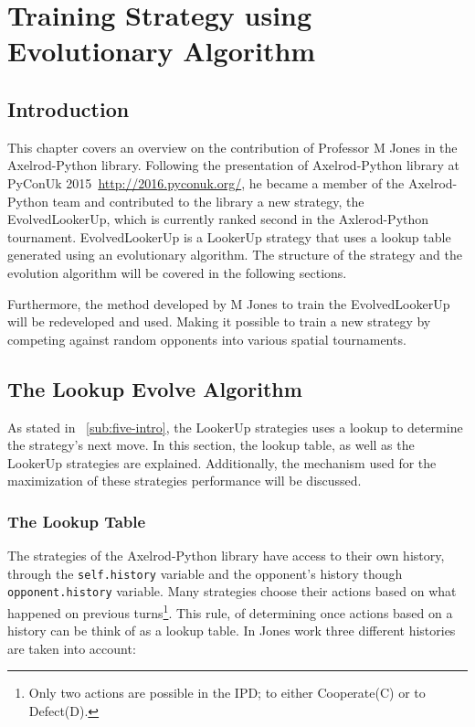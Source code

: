 \chapter{Training Strategy using Evolutionary Algorithm}
\section{Introduction}
\label{sub:five-intro}
This chapter covers an overview on the contribution of Professor M Jones
in the Axelrod-Python library. Following the presentation of Axelrod-Python
library at PyConUk 2015~\url{http://2016.pyconuk.org/}, he became a member of
the Axelrod-Python team and contributed to the library a new strategy, the
EvolvedLookerUp, which is currently ranked second in the Axlerod-Python tournament.
EvolvedLookerUp is a LookerUp strategy that uses a lookup table generated using an
evolutionary algorithm. The structure of the strategy and the evolution algorithm
will be covered in the following sections.

Furthermore, the method developed by M Jones to train the EvolvedLookerUp
will be redeveloped and used. Making it possible to train a new strategy
by competing against random opponents into various spatial tournaments.


\section{The Lookup Evolve Algorithm}
\label{sub:lookup-evolve-algorithm}
As stated in ~\autoref{sub:five-intro}, the LookerUp strategies uses a lookup to
determine the strategy's next move. In this section, the lookup table, as well as
the LookerUp strategies are explained. Additionally, the mechanism used for the
maximization of these strategies performance will be discussed.

\subsection{The Lookup Table}
The strategies of the Axelrod-Python library have access to their own history,
through the \texttt{self.history} variable and the opponent's history though
\texttt{opponent.history} variable. Many strategies choose their actions based
on what happened on previous turns\footnote{Only two actions are possible in the
IPD; to either Cooperate(C) or to Defect(D).}. This rule, of determining once actions
based on a history can be think of as a lookup table.
In Jones work three different histories are taken into account:

